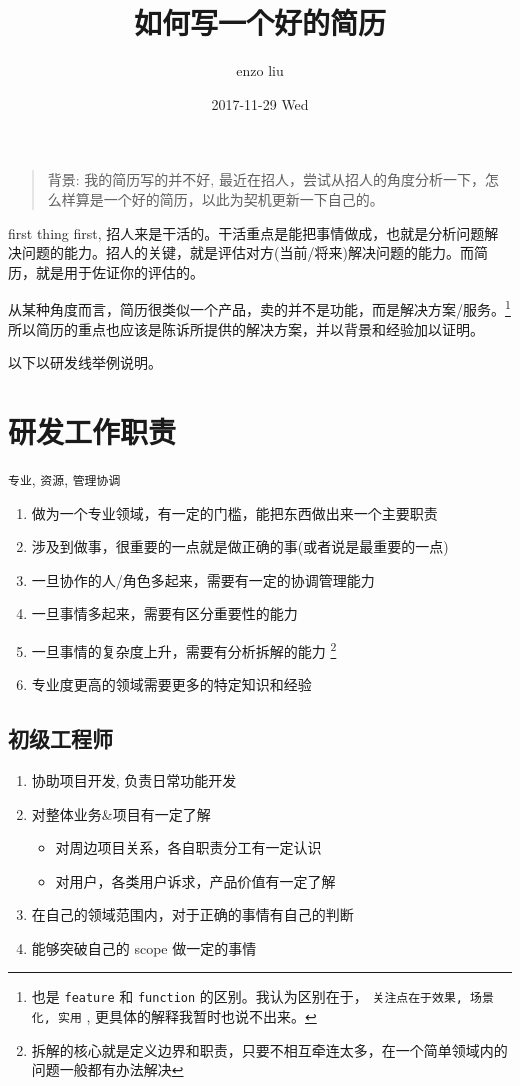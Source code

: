 \documentclass[11pt,a4paper]{article}
\author{enzo liu}
\date{2017-11-29 Wed}
\title{如何写一个好的简历}
\begin{document}
\maketitle
\begin{quote}
背景: 我的简历写的并不好, 最近在招人，尝试从招人的角度分析一下，怎么样算是一个好的简历，以此为契机更新一下自己的。
\end{quote}

first thing first, 招人来是干活的。干活重点是能把事情做成，也就是分析问题解决问题的能力。招人的关键，就是评估对方(当前/将来)解决问题的能力。而简历，就是用于佐证你的评估的。

从某种角度而言，简历很类似一个产品，卖的并不是功能，而是解决方案/服务。\footnote{也是 \texttt{feature} 和 \texttt{function} 的区别。我认为区别在于， \texttt{关注点在于效果, 场景化, 实用} , 更具体的解释我暂时也说不出来。} 所以简历的重点也应该是陈诉所提供的解决方案，并以背景和经验加以证明。

以下以研发线举例说明。

\section*{研发工作职责}
\label{sec:orga119b19}
\texttt{专业}, \texttt{资源}, \texttt{管理协调}

\begin{enumerate}
\item 做为一个专业领域，有一定的门槛，能把东西做出来一个主要职责
\item 涉及到做事，很重要的一点就是做正确的事(或者说是最重要的一点)
\item 一旦协作的人/角色多起来，需要有一定的协调管理能力
\item 一旦事情多起来，需要有区分重要性的能力
\item 一旦事情的复杂度上升，需要有分析拆解的能力 \footnote{拆解的核心就是定义边界和职责，只要不相互牵连太多，在一个简单领域内的问题一般都有办法解决}
\item 专业度更高的领域需要更多的特定知识和经验
\end{enumerate}

\subsection*{初级工程师}
\label{sec:org5e872e8}
\begin{enumerate}
\item 协助项目开发, 负责日常功能开发
\item 对整体业务\&项目有一定了解
\begin{itemize}
\item 对周边项目关系，各自职责分工有一定认识
\item 对用户，各类用户诉求，产品价值有一定了解
\end{itemize}
\item 在自己的领域范围内，对于正确的事情有自己的判断
\item 能够突破自己的 scope 做一定的事情
\end{enumerate}
\end{document}
